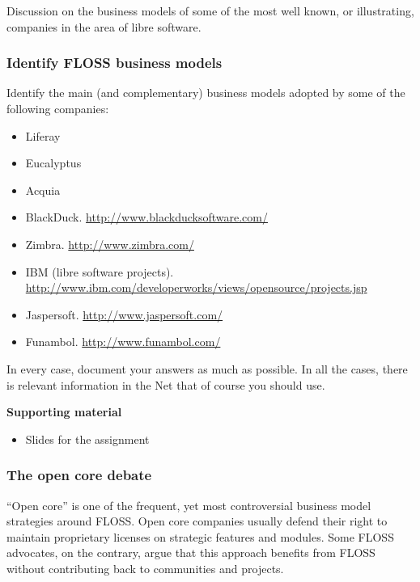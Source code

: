 \documentclass[a4paper]{article}
\begin{document}
Discussion on the business models of some of the most well known, or illustrating, companies in the area of libre software.

\subsubsection{Identify FLOSS business models}
\label{sub:business-models}

Identify the main (and complementary) business models adopted by some of the following companies:

\begin{itemize}
\item Liferay
\item Eucalyptus
\item Acquia
\item BlackDuck.
   \url{http://www.blackducksoftware.com/}
 \item Zimbra.
   \url{http://www.zimbra.com/}
 \item IBM (libre software projects).
   \footnotesize{\url{http://www.ibm.com/developerworks/views/opensource/projects.jsp}}
 \item Jaspersoft.
   \url{http://www.jaspersoft.com/}
 \item Funambol.
   \url{http://www.funambol.com/}
\end{itemize}

In every case, document your answers as much as possible. In all the cases, there is relevant information in the Net that of course you should use.

\textbf{Supporting material}

\begin{itemize}
\item Slides for the assignment
\end{itemize}

\subsubsection{The open core debate}
\label{sub:business-opencore}

``Open core'' is one of the frequent, yet most controversial business model strategies around FLOSS. Open core companies usually defend their right to maintain proprietary licenses on strategic features and modules. Some FLOSS advocates, on the contrary, argue that this approach benefits from FLOSS without contributing back to communities and projects.
\end{document}
